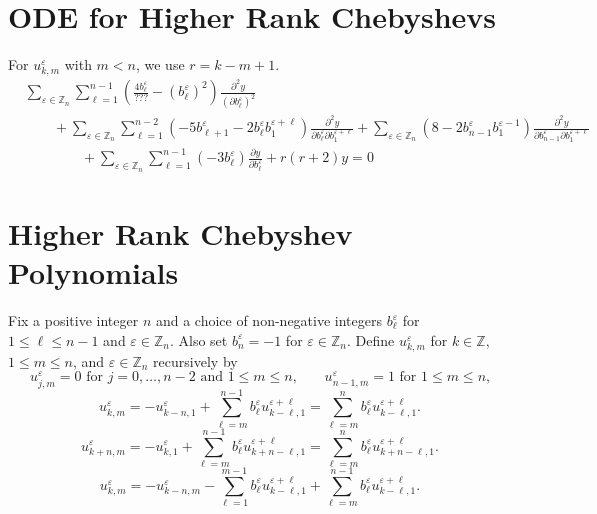 \documentclass{amsart}
\numberwithin{theorem}{section}
\newcommand{\ZZ}{\mathbb{Z}}
\begin{document}
\section{ODE for Higher Rank Chebyshevs}

  For $u_{k,m}^\varepsilon$ with $m<n$, we use $r=k-m+1$.
  \begin{align*}
    & \sum_{\varepsilon\in\ZZ_n}\sum\limits_{\ell=1}^{n-1} \left(\frac{4 b_\ell^\varepsilon}{???}-(b_\ell^\varepsilon)^2\right)\frac{\partial^2 y}{(\partial b_\ell^\varepsilon)^2}\\
    & \qquad + \sum_{\varepsilon\in\ZZ_n}\sum\limits_{\ell=1}^{n-2} (-5b_{\ell+1}^\varepsilon-2b_\ell^\varepsilon b_1^{\varepsilon+\ell})\frac{\partial^2 y}{\partial b_\ell^\varepsilon \partial b_1^{\varepsilon+\ell}} + \sum_{\varepsilon\in\ZZ_n} (8-2b_{n-1}^\varepsilon b_1^{\varepsilon-1})\frac{\partial^2 y}{\partial b_{n-1}^\varepsilon \partial b_1^{\varepsilon+\ell}}\\
    & \qquad \qquad + \sum_{\varepsilon\in\ZZ_n}\sum\limits_{\ell=1}^{n-1} (-3b_\ell^\varepsilon) \frac{\partial y}{\partial b_\ell^\varepsilon} + r(r+2) y = 0
  \end{align*}

\section{Higher Rank Chebyshev Polynomials}
  Fix a positive integer $n$ and a choice of non-negative integers $b_\ell^\varepsilon$ for $1\le \ell\le n-1$ and $\varepsilon\in\ZZ_n$.
  Also set $b_n^\varepsilon=-1$ for $\varepsilon\in\ZZ_n$.
  Define $u_{k,m}^\varepsilon$ for $k\in\ZZ$, $1\le m\le n$, and $\varepsilon\in\ZZ_n$ recursively by
  \[u_{j,m}^\varepsilon = 0 \text{ for $j=0,\ldots,n-2$ and $1\le m\le n$,} \qquad u_{n-1,m}^\varepsilon = 1 \text{ for $1\le m\le n$,}\]
  \[u_{k,m}^\varepsilon = -u_{k-n,1}^\varepsilon+\sum\limits_{\ell=m}^{n-1} b_\ell^\varepsilon u_{k-\ell,1}^{\varepsilon+\ell} = \sum\limits_{\ell=m}^n b_\ell^\varepsilon u_{k-\ell,1}^{\varepsilon+\ell}.\]
  \[u_{k+n,m}^\varepsilon = -u_{k,1}^\varepsilon+\sum\limits_{\ell=m}^{n-1} b_\ell^\varepsilon u_{k+n-\ell,1}^{\varepsilon+\ell} = \sum\limits_{\ell=m}^n b_\ell^\varepsilon u_{k+n-\ell,1}^{\varepsilon+\ell}.\]
  \[u_{k,m}^\varepsilon = -u_{k-n,m}^\varepsilon-\sum\limits_{\ell=1}^{m-1} b_\ell^\varepsilon u_{k-\ell,1}^{\varepsilon+\ell}+\sum\limits_{\ell=m}^{n-1} b_\ell^\varepsilon u_{k-\ell,1}^{\varepsilon+\ell}.\]
\end{document}
